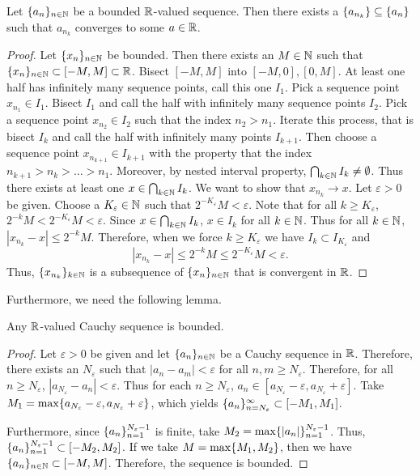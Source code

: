 \documentclass[notitlepage]{simple}
\begin{document}
\begin{thm}
	Let $\lbrace a_n \rbrace_{n\in\mathbb{N}}$ be a bounded $\mathbb{R}$-valued sequence.
	Then there exists a $\lbrace a_{n_k} \rbrace\subseteq\lbrace a_n \rbrace$ such that $a_{n_k}$ converges to some $a\in\mathbb{R}$.
\end{thm}
\begin{proof}
	Let $\lbrace x_n \rbrace_{n\in\mathbb{N}}$ be bounded.
	Then there exists an $M\in\mathbb{N}$ such that $\lbrace x_n \rbrace_{n\in\mathbb{N}}\subset[-M,M]\subset\mathbb{R}$.
	Bisect $[-M,M]$ into $[-M,0],[0,M]$.
	At least one half has infinitely many sequence points, call this one $I_1$.
	Pick a sequence point $x_{n_1}\in I_1$.
	Bisect $I_1$ and call the half with infinitely many sequence points $I_2$.
	Pick a sequence point $x_{n_2}\in I_2$ such that the index $n_2>n_1$.
	Iterate this process, that is bisect $I_k$ and call the half with infinitely many points $I_{k+1}$.
	Then choose a sequence point $x_{n_{k+1}}\in I_{k+1}$ with the property that the index $n_{k+1}>n_k>\ldots > n_1$.
	Moreover, by nested interval property, $\bigcap_{k\in\mathbb{N}} I_k\neq\emptyset$.
	Thus there exists at least one $x\in \bigcap_{k\in\mathbb{N}} I_k$.
	We want to show that $x_{n_k}\rightarrow x$.
	Let $\varepsilon> 0$ be given.
	Choose a $K_\varepsilon\in\mathbb{N}$ such that $2^{-K_\varepsilon}M< \varepsilon$.
	Note that for all $k\geq K_\varepsilon$, $2^{-k} M <  2^{-K_\varepsilon}M< \varepsilon$.
	Since $x\in \bigcap_{k\in\mathbb{N}} I_k$, $x\in I_k$ for all $k\in\mathbb{N}$.
	Thus for all $k\in\mathbb{N}$, $|x_{n_k}-x|\leq 2^{-k}M$.
	Therefore, when we force $k\geq K_\varepsilon$ we have $I_k\subset I_{K_\varepsilon}$ and
	\[
	|x_{n_k}-x|\leq 2^{-k}M \leq 2^{-K_\varepsilon} M < \varepsilon.
	\]
	Thus, $\lbrace x_{n_k} \rbrace_{k\in\mathbb{N}}$ is a subsequence of $\lbrace x_n \rbrace_{n\in\mathbb{N}}$ that is convergent in $\mathbb{R}$.
\end{proof}

Furthermore, we need the following lemma.

\begin{lemma}
	Any $\mathbb{R}$-valued Cauchy sequence is bounded.
\end{lemma}
\begin{proof}
	Let $\varepsilon >0$ be given and let $\lbrace a_n \rbrace_{n\in\mathbb{N}}$ be a Cauchy sequence in $\mathbb{R}$.
	Therefore, there exists an $N_\varepsilon$ such that $|a_n-a_m|<\varepsilon$ for all $n,m\geq N_\varepsilon$.
	Therefore, for all $n\geq N_\varepsilon$, $|a_{N_\varepsilon}-a_n|<\varepsilon$.
	Thus for each $n\geq N_\varepsilon$, $a_n\in[a_{N_\varepsilon}-\varepsilon,a_{N_\varepsilon}+\varepsilon]$.
	Take $M_1=\max\lbrace a_{N_\varepsilon}-\varepsilon,a_{N_\varepsilon}+\varepsilon \rbrace$, which yields $\lbrace a_n \rbrace_{n=N_\varepsilon}^\infty\subset[-M_1,M_1]$.

	Furthermore, since $\lbrace a_n \rbrace_{n=1}^{N_\varepsilon-1}$ is finite, take $M_2=\max\lbrace |a_n| \rbrace_{n=1}^{N_\varepsilon-1}$.
	Thus, $\lbrace a_n \rbrace_{n=1}^{N_\varepsilon-1}\subset [-M_2,M_2]$.
	If we take $M=\max\lbrace M_1,M_2 \rbrace$, then we have $\lbrace a_n \rbrace_{n\in\mathbb{N}}\subset[-M,M]$.
	Therefore, the sequence is bounded.
\end{proof}
\end{document}
